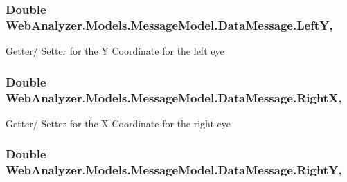 \subsubsection[{Left\+Y}]{\setlength{\rightskip}{0pt plus 5cm}Double Web\+Analyzer.\+Models.\+Message\+Model.\+Data\+Message.\+Left\+Y\hspace{0.3cm}{\ttfamily [get]}, {\ttfamily [set]}}\label{class_web_analyzer_1_1_models_1_1_message_model_1_1_data_message_a409dc72ec09e601fbbd9dc4db680932c}


Getter/ Setter for the Y Coordinate for the left eye 

\hypertarget{class_web_analyzer_1_1_models_1_1_message_model_1_1_data_message_ab650b2ca778810b8a6fbd0d7530318a9}{}
\subsubsection[{Right\+X}]{\setlength{\rightskip}{0pt plus 5cm}Double Web\+Analyzer.\+Models.\+Message\+Model.\+Data\+Message.\+Right\+X\hspace{0.3cm}{\ttfamily [get]}, {\ttfamily [set]}}\label{class_web_analyzer_1_1_models_1_1_message_model_1_1_data_message_ab650b2ca778810b8a6fbd0d7530318a9}


Getter/ Setter for the X Coordinate for the right eye 

\hypertarget{class_web_analyzer_1_1_models_1_1_message_model_1_1_data_message_a3b554f231e24414cfa625552ff2635df}{}
\subsubsection[{Right\+Y}]{\setlength{\rightskip}{0pt plus 5cm}Double Web\+Analyzer.\+Models.\+Message\+Model.\+Data\+Message.\+Right\+Y\hspace{0.3cm}{\ttfamily [get]}, {\ttfamily [set]}}\label{class_web_analyzer_1_1_models_1_1_message_model_1_1_data_message_a3b554f231e24414cfa625552ff2635df}


